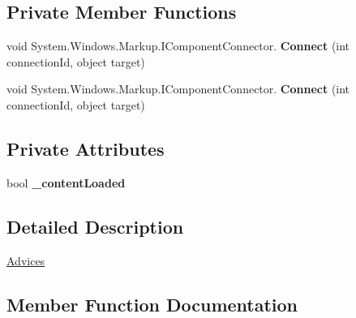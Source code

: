 \subsection*{Private Member Functions}
\begin{DoxyCompactItemize}
\item 
\mbox{\label{class_t_h_b___plugin___social_1_1_advices_1_1_advices_a13d20d8ac01863194fee5df3ef954add}} 
void System.\+Windows.\+Markup.\+I\+Component\+Connector. {\bfseries Connect} (int connection\+Id, object target)
\item 
\mbox{\label{class_t_h_b___plugin___social_1_1_advices_1_1_advices_a13d20d8ac01863194fee5df3ef954add}} 
void System.\+Windows.\+Markup.\+I\+Component\+Connector. {\bfseries Connect} (int connection\+Id, object target)
\end{DoxyCompactItemize}
\subsection*{Private Attributes}
\begin{DoxyCompactItemize}
\item 
\mbox{\label{class_t_h_b___plugin___social_1_1_advices_1_1_advices_a46fa630dbede5b98b08a931896020306}} 
bool {\bfseries \+\_\+content\+Loaded}
\end{DoxyCompactItemize}


\subsection{Detailed Description}
\mbox{\hyperlink{class_t_h_b___plugin___social_1_1_advices_1_1_advices}{Advices}} 



\subsection{Member Function Documentation}
\mbox{\label{class_t_h_b___plugin___social_1_1_advices_1_1_advices_a270ffdf24c38f6c886996ff608b940a2}} 
